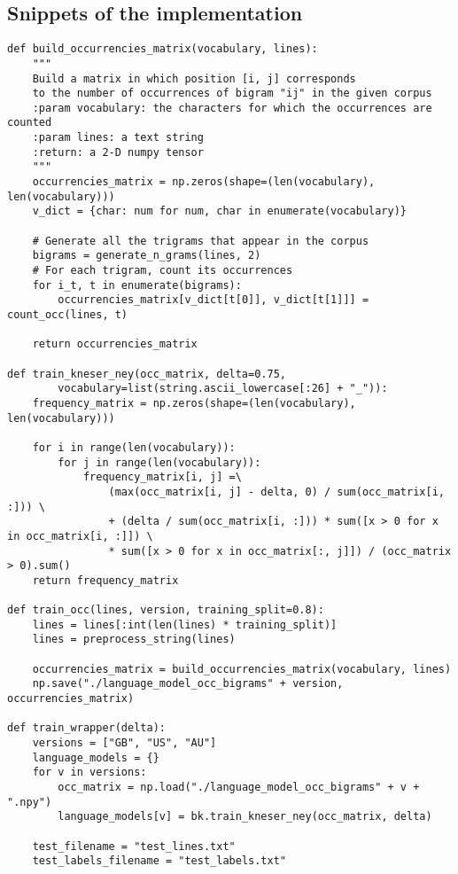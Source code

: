 \documentclass[
12pt,
a4paper,
oneside,
headinclude,
footinclude]{article}
\theoremstyle{definition} %
\begin{document}
\subsection{Snippets of the implementation}
\begin{verbatim}
def build_occurrencies_matrix(vocabulary, lines):
    """
    Build a matrix in which position [i, j] corresponds
    to the number of occurrences of bigram "ij" in the given corpus
    :param vocabulary: the characters for which the occurrences are counted
    :param lines: a text string
    :return: a 2-D numpy tensor
    """
    occurrencies_matrix = np.zeros(shape=(len(vocabulary), len(vocabulary)))
    v_dict = {char: num for num, char in enumerate(vocabulary)}
    
    # Generate all the trigrams that appear in the corpus
    bigrams = generate_n_grams(lines, 2)
    # For each trigram, count its occurrences
    for i_t, t in enumerate(bigrams):
        occurrencies_matrix[v_dict[t[0]], v_dict[t[1]]] = count_occ(lines, t)
    
    return occurrencies_matrix

def train_kneser_ney(occ_matrix, delta=0.75,
        vocabulary=list(string.ascii_lowercase[:26] + "_")):
    frequency_matrix = np.zeros(shape=(len(vocabulary), len(vocabulary)))
    
    for i in range(len(vocabulary)):
        for j in range(len(vocabulary)):
            frequency_matrix[i, j] =\
                (max(occ_matrix[i, j] - delta, 0) / sum(occ_matrix[i, :])) \
                + (delta / sum(occ_matrix[i, :])) * sum([x > 0 for x in occ_matrix[i, :]]) \
                * sum([x > 0 for x in occ_matrix[:, j]]) / (occ_matrix > 0).sum()   
    return frequency_matrix
    
def train_occ(lines, version, training_split=0.8):  
    lines = lines[:int(len(lines) * training_split)]
    lines = preprocess_string(lines)
    
    occurrencies_matrix = build_occurrencies_matrix(vocabulary, lines)
    np.save("./language_model_occ_bigrams" + version, occurrencies_matrix)
  
def train_wrapper(delta):
    versions = ["GB", "US", "AU"]
    language_models = {}
    for v in versions:
        occ_matrix = np.load("./language_model_occ_bigrams" + v + ".npy")
        language_models[v] = bk.train_kneser_ney(occ_matrix, delta)
    
    test_filename = "test_lines.txt"
    test_labels_filename = "test_labels.txt"
    

\end{verbatim}
\end{document}
